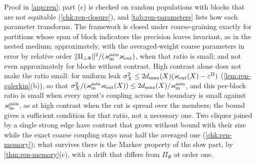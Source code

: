 Proof in \cref{app:ren}; part (c) is checked on random populations with blocks that are not equitable (\cref{chk:ren-closure}), and \cref{tab:ren-parameters} lists how each parameter transforms. The framework is closed under coarse-graining exactly for partitions whose span of block indicators the precision leaves invariant, as in the nested medium; approximately, with the averaged-weight coarse parameters in error by relative order $\Vert\Pi_{\perp\Phi}\Vert^2/(\varkappa_{\mathrm{in}}^{\min}\varkappa_{\mathrm{out}})$, when that ratio is small; and not even approximately for blocks without contrast. High contrast alone does not make the ratio small: for uniform leak $\sigma_X^2\le2d_{\max}(X)(\varkappa_{\mathrm{out}}(X)-\varepsilon^\Pi)$ (\cref{lem:ren-galerkin}(b)), so that $\sigma_X^2/(\varkappa_{\mathrm{in}}^{\min}\varkappa_{\mathrm{out}}(X))\le2d_{\max}(X)/\varkappa_{\mathrm{in}}^{\min}$, and this per-block ratio is small when every agent's coupling across the boundary is small against $\varkappa_{\mathrm{in}}^{\min}$, as at high contrast when the cut is spread over the members; the bound gives a sufficient condition for that ratio, not a necessary one. Two cliques joined by a single strong edge have contrast that grows without bound with their size while the exact coarse coupling stays near half the averaged one (\cref{chk:ren-memory}); what survives there is the Markov property of the slow part, by \cref{thm:ren-memory}(c), with a drift that differs from $\Pi_\Phi$ at order one.

